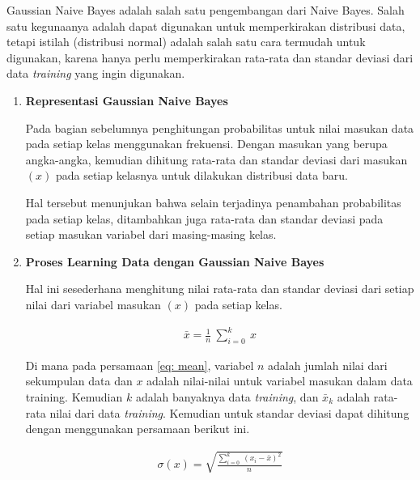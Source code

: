 Gaussian Naive Bayes adalah salah satu pengembangan dari Naive Bayes. Salah satu kegunaanya adalah dapat digunakan untuk memperkirakan distribusi data, tetapi istilah  (distribusi normal) adalah salah satu cara termudah untuk digunakan, karena hanya perlu memperkirakan rata-rata dan standar deviasi dari data \textit{training} yang ingin digunakan.
\vspace{1ex}

\begin{enumerate}[label=\textbf{\arabic*).}]
	
	\item \textbf{Representasi Gaussian Naive Bayes}
	\setlength{\parindent}{0.8cm}

	Pada bagian sebelumnya penghitungan probabilitas untuk nilai masukan data pada setiap kelas menggunakan frekuensi. Dengan masukan yang berupa angka-angka, kemudian dihitung rata-rata dan standar deviasi dari masukan $(x)$ pada setiap kelasnya untuk dilakukan distribusi data baru.
	\vspace{1ex}
	
	Hal tersebut menunjukan bahwa selain terjadinya penambahan probabilitas pada setiap kelas, ditambahkan juga rata-rata dan standar deviasi pada setiap masukan variabel dari masing-masing kelas.

	\item \textbf{Proses Learning Data dengan Gaussian Naive Bayes}
	
	Hal ini sesederhana menghitung nilai rata-rata dan standar deviasi dari setiap nilai dari variabel masukan $(x)$ pada setiap kelas.
	
	\begin{equation}\label{eq: mean}
	\begin{split}
	\bar x = \frac{1}{n}\ \sum_{i=0}^{k}\ x
	\end{split}
	\end{equation}
	
	Di mana pada persamaan \ref{eq: mean}, variabel $n$ adalah jumlah nilai dari sekumpulan data dan $x$ adalah nilai-nilai untuk variabel masukan dalam data training. Kemudian $k$ adalah banyaknya data \textit{training}, dan $\bar x_{k}$ adalah rata-rata nilai dari data \textit{training}. Kemudian untuk standar deviasi dapat dihitung dengan menggunakan persamaan berikut ini.
	
	\begin{equation}\label{eq: stdeviasi}
	\begin{split}
	\sigma(x) = \sqrt{\frac{\sum_{i = 0}^{k}\ (x_{i} - \bar{x})^{2}}{n}}
	\end{split}
	\end{equation}
	

\end{enumerate}
